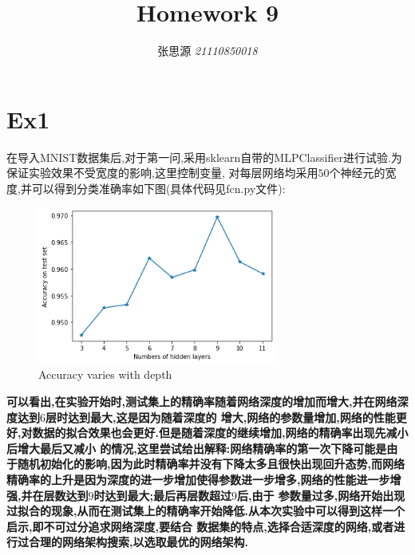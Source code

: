 \documentclass[UTF8,a4paper,11pt]{ctexart}
\title{\textbf{Homework 9}}
\author{ 张思源  \qquad  \textit{21110850018} }   %
\begin{document}
\maketitle
\section{Ex1}
\par 在导入MNIST数据集后,对于第一问,采用sklearn自带的MLPClassifier进行试验.为保证实验效果不受宽度的影响,这里控制变量,
对每层网络均采用$50$个神经元的宽度,并可以得到分类准确率如下图(具体代码见fcn.py文件):
\begin{figure}[H]
	\centering
	\includegraphics[width=0.7\textwidth,height=0.5\textwidth]{1.png}
	\caption{Accuracy varies with depth}
\end{figure}
\textbf{可以看出,在实验开始时,测试集上的精确率随着网络深度的增加而增大,并在网络深度达到$6$层时达到最大,这是因为随着深度的
增大,网络的参数量增加,网络的性能更好,对数据的拟合效果也会更好.但是随着深度的继续增加,网络的精确率出现先减小后增大最后又减小
的情况,这里尝试给出解释:网络精确率的第一次下降可能是由于随机初始化的影响,因为此时精确率并没有下降太多且很快出现回升态势,而网络
精确率的上升是因为深度的进一步增加使得参数进一步增多,网络的性能进一步增强,并在层数达到$9$时达到最大;最后再层数超过$9$后,由于
参数量过多,网络开始出现过拟合的现象,从而在测试集上的精确率开始降低.从本次实验中可以得到这样一个启示,即不可过分追求网络深度,要结合
数据集的特点,选择合适深度的网络,或者进行过合理的网络架构搜索,以选取最优的网络架构.}
\end{document}

